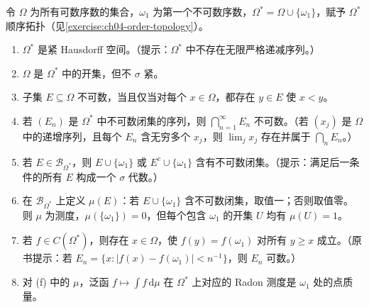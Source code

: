 \documentclass[../../main.tex]{subfiles}
\begin{document}
\begin{exercise}\label{exercise:ch07-ordinal-measure}
令 $\Omega$ 为所有可数序数的集合，$\omega_1$ 为第一个不可数序数，$\Omega^*=\Omega\cup\{\omega_1\}$，赋予 $\Omega^*$ 顺序拓扑（见\cref{exercise:ch04-order-topology}）。
\begin{enumerate}[label=\alph*.,ref=(\alph*)]
\item\label{item:ch07-ordinal-compact} $\Omega^*$ 是紧 Hausdorff 空间。（提示：$\Omega^*$ 中不存在无限严格递减序列。）
\item\label{item:ch07-ordinal-not-sigma-compact} $\Omega$ 是 $\Omega^*$ 中的开集，但不 $\sigma$ 紧。
\item\label{item:ch07-ordinal-uncountable-cofinal} 子集 $E\subseteq\Omega$ 不可数，当且仅当对每个 $x\in\Omega$，都存在 $y\in E$ 使 $x<y$。
\item\label{item:ch07-ordinal-countable-intersection} 若 $(E_n)$ 是 $\Omega^*$ 中不可数闭集的序列，则 $\bigcap_{n=1}^\infty E_n$ 不可数。（若 $(x_j)$ 是 $\Omega$ 中的递增序列，且每个 $E_n$ 含无穷多个 $x_j$，则 $\lim_jx_j$ 存在并属于 $\bigcap_nE_n$。）
\item\label{item:ch07-ordinal-borel-dichotomy} 若 $E\in\mathscr B_{\Omega^*}$，则 $E\cup\{\omega_1\}$ 或 $E^c\cup\{\omega_1\}$ 含有不可数闭集。（提示：满足后一条件的所有 $E$ 构成一个 $\sigma$ 代数。）
\item\label{item:ch07-ordinal-nonregular-measure} 在 $\mathscr B_{\Omega^*}$ 上定义 $\mu(E)$：若 $E\cup\{\omega_1\}$ 含不可数闭集，取值一；否则取值零。则 $\mu$ 为测度，$\mu(\{\omega_1\})=0$，但每个包含 $\omega_1$ 的开集 $U$ 均有 $\mu(U)=1$。
\item\label{item:ch07-ordinal-eventual-constant} 若 $f\in C(\Omega^*)$，则存在 $x\in\Omega$，使 $f(y)=f(\omega_1)$ 对所有 $y\geqslant x$ 成立。（原书提示：若 $E_n=\{x:|f(x)-f(\omega_1)|<n^{-1}\}$，则 $E_n$ 可数。）
\item\label{item:ch07-ordinal-associated-point-mass} 对 (f) 中的 $\mu$，泛函 $f\mapsto\int f\,\mathrm d\mu$ 在 $\Omega^*$ 上对应的 Radon 测度是 $\omega_1$ 处的点质量。
\end{enumerate}
\end{exercise}
\end{document}
